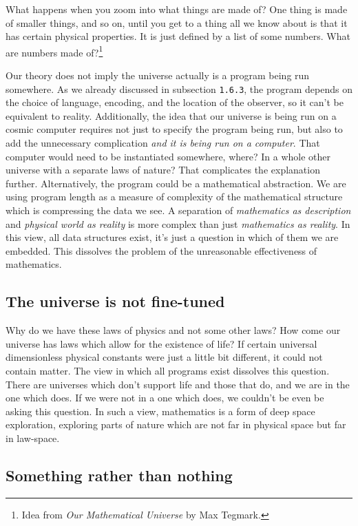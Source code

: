 What happens when you zoom into what things are made of?
One thing is made of smaller things, and so on, until you get to a thing all we know about is that it has certain physical properties.
It is just defined by a list of some numbers.
What are numbers made of?\footnote{Idea from \textit{Our Mathematical Universe} by Max Tegmark.}

Our theory does not imply the universe actually is a program being run somewhere.
As we already discussed in subsection \texttt{1.6.3}, the program depends on the choice of language, encoding, and the location of the observer, so it can't be equivalent to reality.
Additionally, the idea that our universe is being run on a cosmic computer requires not just to specify the program being run, but also to add the unnecessary complication \textit{and it is being run on a computer}. 
That computer would need to be instantiated somewhere, where?
In a whole other universe with a separate laws of nature?
That complicates the explanation further. 
Alternatively, the program could be a mathematical abstraction.
We are using program length as a measure of complexity of the mathematical structure which is compressing the data we see.
A separation of \textit{mathematics as description} and \textit{physical world as reality} is more complex than just \textit{mathematics as reality}.
In this view, all data structures exist, it's just a question in which of them we are embedded.
This dissolves the problem of the unreasonable effectiveness of mathematics.

\newpage

\subsection{The universe is not fine-tuned}

Why do we have these laws of physics and not some other laws?
How come our universe has laws which allow for the existence of life? 
If certain universal dimensionless physical constants were just a little bit different, it could not contain matter.
The view in which all programs exist dissolves this question.
There are universes which don't support life and those that do, and we are in the one which does.
If we were not in a one which does, we couldn't be even be asking this question.
In such a view, mathematics is a form of deep space exploration, exploring parts of nature which are not far in physical space but far in law-space.

\newpage

\subsection{Something rather than nothing}

